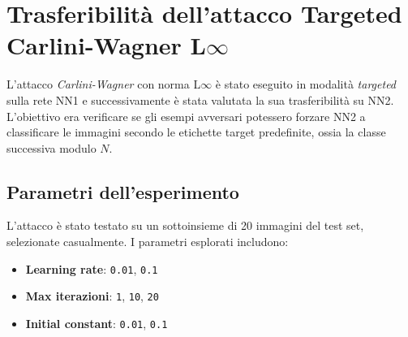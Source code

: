     \section{Trasferibilità dell'attacco Targeted Carlini-Wagner L$\infty$ }
        L'attacco \textit{Carlini-Wagner} con norma L$\infty$ è stato eseguito in modalità \textit{targeted} sulla rete NN1 e successivamente è stata valutata la sua trasferibilità su NN2. L’obiettivo era verificare se gli esempi avversari potessero forzare NN2 a classificare le immagini secondo le etichette target predefinite, ossia la classe successiva modulo $N$.

        \subsection{Parametri dell'esperimento}
            L'attacco è stato testato su un sottoinsieme di 20 immagini del test set, selezionate casualmente.
            I parametri esplorati includono:
                \begin{itemize}
                  \item \textbf{Learning rate}: \texttt{0.01}, \texttt{0.1}
                  \item \textbf{Max iterazioni}: \texttt{1}, \texttt{10}, \texttt{20}
                  \item \textbf{Initial constant}: \texttt{0.01}, \texttt{0.1}
                \end{itemize}

